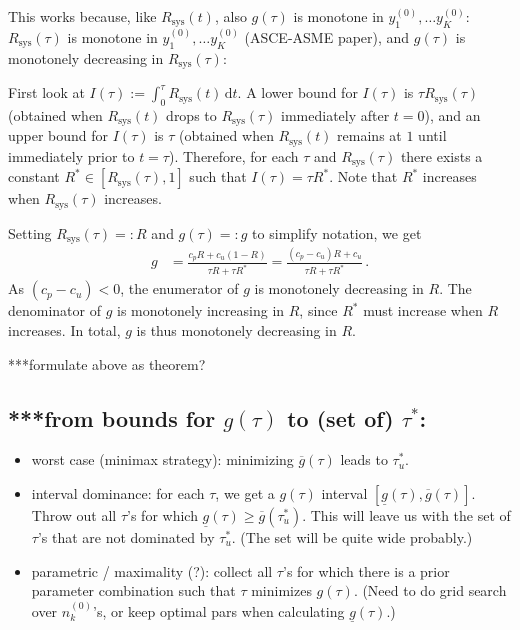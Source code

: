 \documentclass[authoryear]{elsarticle}
\newcommand{\dd}{\,\mathrm{d}}
\newcommand{\uz}{^{(0)}} %
\newcommand{\ul}[1]{\underline{#1}}
\newcommand{\ol}[1]{\overline{#1}}
\newcommand{\Rsys}{R_\text{sys}}
\newcommand{\lgt}{\ul{g}}
\newcommand{\ugt}{\ol{g}}
\newcommand{\ykzfun}[1]{y\uz_{#1}}
\def\nkz{n\uz_k}
\begin{document}
This works because, like $\Rsys(t)$, also $g(\tau)$ is monotone in $\ykzfun{1}, \ldots \ykzfun{K}$:
$\Rsys(\tau)$ is monotone in $\ykzfun{1}, \ldots \ykzfun{K}$ (ASCE-ASME paper),
and $g(\tau)$ is monotonely decreasing in $\Rsys(\tau)$:

First look at $I(\tau) := \int_0^\tau \Rsys(t) \dd t$.
A lower bound for $I(\tau)$ is $\tau \Rsys(\tau)$ (obtained when $\Rsys(t)$ drops to $\Rsys(\tau)$ immediately after $t=0$),
and an upper bound for $I(\tau)$ is $\tau$ (obtained when $\Rsys(t)$ remains at $1$ until immediately prior to $t = \tau$).
Therefore, for each $\tau$ and $\Rsys(\tau)$ there exists a constant $R^* \in [\Rsys(\tau), 1]$
such that $I(\tau) = \tau R^*$.
Note that $R^*$ increases when $\Rsys(\tau)$ increases.

Setting $\Rsys(\tau) =: R$ and $g(\tau) =: g$ to simplify notation, we get
\begin{align*}
g &= \frac{c_p R + c_u (1-R)}{\tau R + \tau R^*}
   = \frac{(c_p - c_u) R + c_u}{\tau R + \tau R^*}\,.
\end{align*}
As $(c_p -c_u) < 0$, the enumerator of $g$ is monotonely decreasing in $R$.
The denominator of $g$ is monotonely increasing in $R$, since $R^*$ must increase when $R$ increases.
In total, $g$ is thus monotonely decreasing in $R$.

***formulate above as theorem?


\subsection{***from bounds for $g(\tau)$ to (set of) $\tau^*$:}

\begin{itemize}
\item worst case (minimax strategy): minimizing $\ugt(\tau)$ leads to $\tau^*_u$.
\item interval dominance: for each $\tau$, we get a $g(\tau)$ interval $[\lgt(\tau), \ugt(\tau)]$.
Throw out all $\tau$'s for which $\lgt(\tau) \ge \ugt(\tau^*_u)$.
This will leave us with the set of $\tau$'s that are not dominated by $\tau^*_u$.
(The set will be quite wide probably.)
\item parametric / maximality (?): collect all $\tau$'s for which there is a prior parameter combination such that $\tau$ minimizes $g(\tau)$.
(Need to do grid search over $\nkz$'s, or keep optimal pars when calculating $\lgt(\tau)$.)
\end{itemize}
\end{document}
